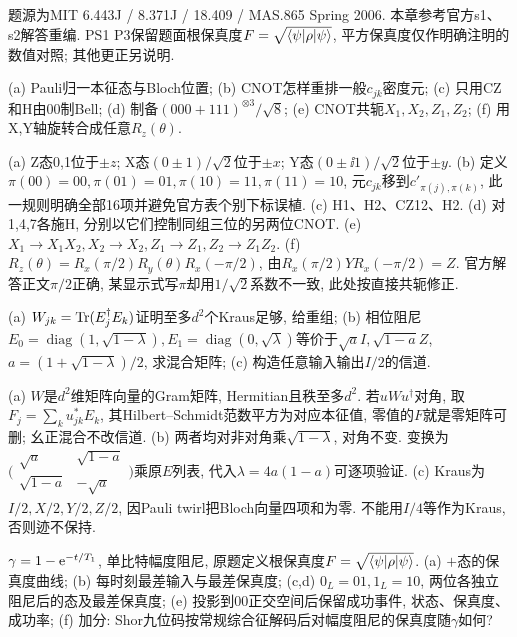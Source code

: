 题源为MIT 6.443J / 8.371J / 18.409 / MAS.865 Spring 2006. 本章参考官方s1、s2解答重编. PS1 P3保留题面根保真度$F=\sqrt{\langle \psi\rvert\rho\lvert \psi\rangle}$, 平方保真度仅作明确注明的数值对照; 其他更正另说明.
\begin{exercise}(a) Pauli归一本征态与Bloch位置; (b) CNOT怎样重排一般$c_{jk}$密度元; (c) 只用CZ和H由00制Bell; (d) 制备$(000+111)^{\otimes3}/\sqrt8$; (e) CNOT共轭$X_1,X_2,Z_1,Z_2$; (f) 用X,Y轴旋转合成任意$R_z(\theta)$.\end{exercise}
\begin{solution}(a) Z态0,1位于$\pm z$; X态$(0\pm1)/\sqrt2$位于$\pm x$; Y态$(0\pm\ii1)/\sqrt2$位于$\pm y$. (b) 定义$\pi(00)=00,\pi(01)=01,\pi(10)=11,\pi(11)=10$, 元$c_{jk}$移到$c'_{\pi(j),\pi(k)}$, 此一规则明确全部16项并避免官方表个别下标误植. (c) H1、H2、CZ12、H2. (d) 对1,4,7各施H, 分别以它们控制同组三位的另两位CNOT. (e) $X_1\to X_1X_2,X_2\to X_2,Z_1\to Z_1,Z_2\to Z_1Z_2$. (f) $R_z(\theta)=R_x(\pi/2)R_y(\theta)R_x(-\pi/2)$, 由$R_x(\pi/2)YR_x(-\pi/2)=Z$. 官方解答正文$\pi/2$正确, 某显示式写$\pi$却用$1/\sqrt2$系数不一致, 此处按直接共轭修正.
\end{solution}
\begin{exercise}(a) $W_{jk}=\operatorname{Tr}(E_j^\dagger E_k)$证明至多$d^2$个Kraus足够, 给重组; (b) 相位阻尼$E_0=\operatorname{diag}(1,\sqrt{1-\lambda}),E_1=\operatorname{diag}(0,\sqrt\lambda)$等价于$\sqrt aI,\sqrt{1-a}Z$, $a=(1+\sqrt{1-\lambda})/2$, 求混合矩阵; (c) 构造任意输入输出$I/2$的信道.\end{exercise}
\begin{solution}(a) $W$是$d^2$维矩阵向量的Gram矩阵, Hermitian且秩至多$d^2$. 若$uWu^\dagger$对角, 取$F_j=\sum_ku_{jk}^*E_k$, 其Hilbert--Schmidt范数平方为对应本征值, 零值的$F$就是零矩阵可删; 幺正混合不改信道. (b) 两者均对非对角乘$\sqrt{1-\lambda}$, 对角不变. 变换为$\bigl(\begin{smallmatrix}\sqrt a&\sqrt{1-a}\\\sqrt{1-a}&-\sqrt a\end{smallmatrix}\bigr)$乘原$E$列表, 代入$\lambda=4a(1-a)$可逐项验证. (c) Kraus为$I/2,X/2,Y/2,Z/2$, 因Pauli twirl把Bloch向量四项和为零. 不能用$I/4$等作为Kraus, 否则迹不保持.
\end{solution}
\begin{exercise}$\gamma=1-\mathrm e^{-t/T_1}$, 单比特幅度阻尼, 原题定义根保真度$F=\sqrt{\langle \psi\rvert\rho\lvert \psi\rangle}$. (a) $+$态的保真度曲线; (b) 每时刻最差输入与最差保真度; (c,d) $0_L=01,1_L=10$, 两位各独立阻尼后的态及最差保真度; (e) 投影到00正交空间后保留成功事件, 状态、保真度、成功率; (f) 加分: Shor九位码按常规综合征解码后对幅度阻尼的保真度随$\gamma$如何?\end{exercise}
